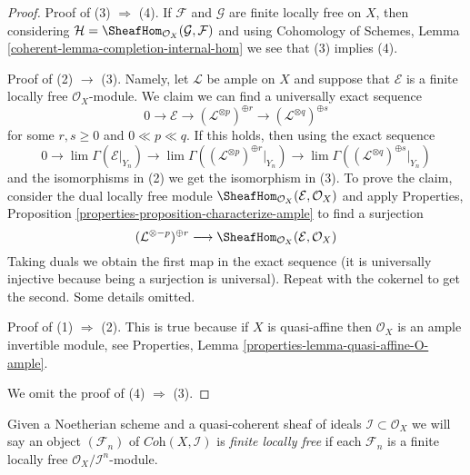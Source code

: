\begin{proof}
Proof of (3) $\Rightarrow$ (4). If $\mathcal{F}$ and $\mathcal{G}$
are finite locally free on $X$, then considering
$\mathcal{H} = \SheafHom_{\mathcal{O}_X}(\mathcal{G}, \mathcal{F})$
and using Cohomology of Schemes, Lemma
\ref{coherent-lemma-completion-internal-hom}
we see that (3) implies (4).

\medskip\noindent
Proof of (2) $\rightarrow$ (3). Namely, let $\mathcal{L}$ be ample
on $X$ and suppose that $\mathcal{E}$ is a
finite locally free $\mathcal{O}_X$-module.
We claim we can find a universally exact sequence
$$
0 \to \mathcal{E} \to
(\mathcal{L}^{\otimes p})^{\oplus r} \to
(\mathcal{L}^{\otimes q})^{\oplus s}
$$
for some $r, s \geq 0$ and $0 \ll p \ll q$. If this holds, then
using the exact sequence
$$
0 \to \lim \Gamma(\mathcal{E}|_{Y_n}) \to
\lim \Gamma((\mathcal{L}^{\otimes p})^{\oplus r}|_{Y_n}) \to
\lim \Gamma((\mathcal{L}^{\otimes q})^{\oplus s}|_{Y_n})
$$
and the isomorphisms in (2) we get the isomorphism in (3).
To prove the claim, consider the dual locally free module
$\SheafHom_{\mathcal{O}_X}(\mathcal{E}, \mathcal{O}_X)$
and apply
Properties, Proposition \ref{properties-proposition-characterize-ample}
to find a surjection
$$
(\mathcal{L}^{\otimes -p})^{\oplus r}
\longrightarrow
\SheafHom_{\mathcal{O}_X}(\mathcal{E}, \mathcal{O}_X)
$$
Taking duals we obtain the first map in the exact sequence
(it is universally injective because being a surjection is universal).
Repeat with the cokernel to get the second. Some details omitted.

\medskip\noindent
Proof of (1) $\Rightarrow$ (2). This is true because if $X$ is quasi-affine
then $\mathcal{O}_X$ is an ample invertible module, see
Properties, Lemma \ref{properties-lemma-quasi-affine-O-ample}.

\medskip\noindent
We omit the proof of (4) $\Rightarrow$ (3).
\end{proof}

\noindent
Given a Noetherian scheme and a quasi-coherent sheaf of ideals
$\mathcal{I} \subset \mathcal{O}_X$ we will say
an object $(\mathcal{F}_n)$ of $\textit{Coh}(X, \mathcal{I})$
is {\it finite locally free} if each $\mathcal{F}_n$ is a finite
locally free $\mathcal{O}_X/\mathcal{I}^n$-module.

